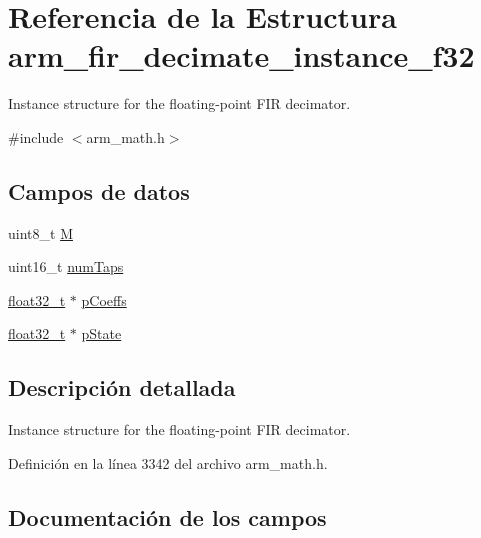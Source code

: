 \hypertarget{structarm__fir__decimate__instance__f32}{}\section{Referencia de la Estructura arm\+\_\+fir\+\_\+decimate\+\_\+instance\+\_\+f32}
\label{structarm__fir__decimate__instance__f32}


Instance structure for the floating-\/point F\+IR decimator.  




{\ttfamily \#include $<$arm\+\_\+math.\+h$>$}

\subsection*{Campos de datos}
\begin{DoxyCompactItemize}
\item 
uint8\+\_\+t \hyperlink{structarm__fir__decimate__instance__f32_ae2c8107d00d3c9942e7a20fc598edecf}{M}
\item 
uint16\+\_\+t \hyperlink{structarm__fir__decimate__instance__f32_a751941891e47f522a7f5375fe8990aac}{num\+Taps}
\item 
\hyperlink{arm__math_8h_a4611b605e45ab401f02cab15c5e38715}{float32\+\_\+t} $\ast$ \hyperlink{structarm__fir__decimate__instance__f32_aacbb8dd8eeba4b21fc2bb40076405ee3}{p\+Coeffs}
\item 
\hyperlink{arm__math_8h_a4611b605e45ab401f02cab15c5e38715}{float32\+\_\+t} $\ast$ \hyperlink{structarm__fir__decimate__instance__f32_a335c87e6fdc4b96601d95a5de8b9c463}{p\+State}
\end{DoxyCompactItemize}


\subsection{Descripción detallada}
Instance structure for the floating-\/point F\+IR decimator. 

Definición en la línea 3342 del archivo arm\+\_\+math.\+h.



\subsection{Documentación de los campos}
